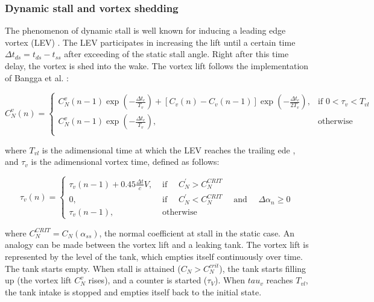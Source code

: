 \subsubsection{Dynamic stall and vortex shedding}

The phenomenon of dynamic stall is well known for inducing a leading edge vortex (LEV) \cite{mccroskey_dynamic_1976,mulleners_onset_2010,mulleners_dynamic_2013}. The LEV participates in increasing the lift until a certain time $\Delta t_{ds}=t_{ds}-t_{ss}$ after exceeding of the static stall angle. Right after this time delay, the vortex is shed into the wake. The vortex lift follows the implementation of Bangga et al. \cite{bangga_improved_2020}:

\begin{equation}
	C_{N}^{v}(n)=
	\begin{cases}
		C_{N}^{v}(n-1) \exp \left(-\frac{\Delta t_c}{T_{v}}\right)+\left[C_{v}(n)-C_{v}(n-1)\right] \exp \left(-\frac{\Delta t_c}{2 T_{v}}\right), & \text{if } 0<\tau_v<T_{vl} \\
		C_{N}^{v}(n-1) \exp \left(-\frac{\Delta t_c}{T_{v}}\right), & \text{otherwise} \\
	\end{cases}	
	\label{eq:vortex_lift}
\end{equation}

\noindent where $T_{vl}$ is the adimensional time at which the LEV reaches the trailing ede \cite{leishman_semi-empirical_1989}, and $\tau_v$ is the adimensional vortex time, defined as follows: 

\begin{equation}
	\tau_{v}(n)=\left\{\begin{array}{ll}
		\tau_{v}(n-1)+0.45 \frac{\Delta t}{c} V, & \text { if } \quad C_N^{\prime}>C_{N}^{CRIT} \\
		0, & \text { if } \quad C_N^{\prime}<C_{N}^{CRIT} \quad \text { and } \quad \Delta \alpha_{n} \geq 0 \\
		\tau_{v}(n-1), & \text { otherwise }
		\end{array}\right.
	\label{eq:adim_vortex_time}	
\end{equation}

\noindent where $C_N^{CRIT}=C_N(\alpha_{ss})$, the normal coefficient at stall in the static case. An analogy can be made between the vortex lift and a leaking tank. The vortex lift is represented by the level of the tank, which empties itself continuously over time. The tank starts empty. When stall is attained ($C_N>C_N^{crit}$), the tank starts filling up (the vortex lift $C_N^v$ rises), and a counter is started ($\tau_V$). When $tau_v$ reaches $T_{vl}$, the tank intake is stopped and empties itself back to the initial state. 

